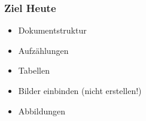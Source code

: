 
\subtitle{Abschnitte, Aufzählungen, Tabellen und Bilder}
\date{2017-05-16}



\begin{frame}
  \frametitle{Ziel Heute}

  \begin{itemize}
  \item Dokumentstruktur
  \item Aufzählungen
  \item Tabellen
  \item Bilder einbinden (nicht erstellen!)
  \item Abbildungen
  \end{itemize}

\end{frame}

